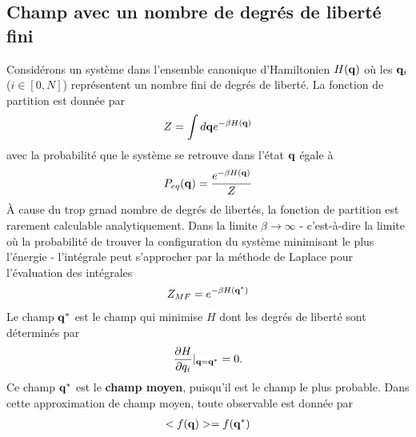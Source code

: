     \subsection{Champ avec un nombre de degrés de liberté fini}
Considérons un système dans l'ensemble canonique d'Hamiltonien  $H({\bf q})$ où les ${\bf q}_i$ ($i \in [0,N]$) représentent un nombre fini de degrés de liberté. La fonction de partition est donnée par 
\begin{align}
    Z = \int d{\bf q} e^{-\beta H({\bf q})}
\end{align}
avec la probabilité que le système se retrouve dans l'état ${\bf q}$ égale à
\begin{align}
    P_{eq}({\bf q}) = \frac{e^{-\beta H({\bf q})}}{Z}
    \label{eqdis}
\end{align}
À cause du trop grnad nombre de degrés de libertés, la fonction de partition est rarement calculable analytiquement. Dans la limite $\beta \to \infty$ - c'est-à-dire la limite où la probabilité de trouver la configuration du système minimisant le plus l'énergie - l'intégrale peut s'approcher par la méthode de Laplace pour l'évaluation des intégrales 
\begin{align}
    Z_{MF}= e^{-\beta H({\bf q}^*)}
\end{align}
Le champ ${\bf q}^*$ est le champ qui minimise $H$ dont les degrés de liberté sont déterminés par
\begin{align}
    \frac{\partial H}{\partial q_i}|_{{\bf q}={\bf q^*}}=0.
\end{align}
Ce champ ${\bf q}^*$ est le \textbf{champ moyen}, puisqu'il est le champ le plus probable. Dans cette approximation de champ moyen, toute observable est donnée par
\begin{align}
    < f({\bf q}) > = f({\bf q}^*)
\end{align}

